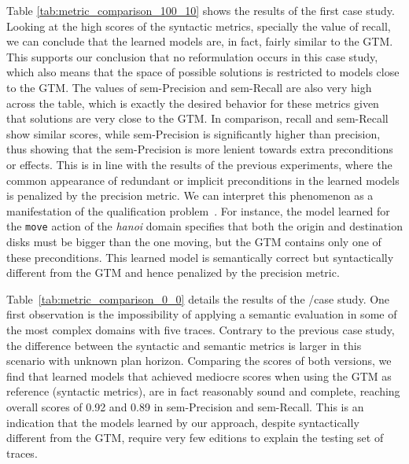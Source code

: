Table \ref{tab:metric_comparison_100_10} shows the results of the first case study. Looking at the high scores of the syntactic metrics, specially the value of recall, we can conclude that the learned models are, in fact, fairly similar to the GTM. This supports our conclusion that no reformulation occurs in this case study, which also means that the space of possible solutions is restricted to models close to the GTM. The values of sem-Precision and sem-Recall are also very high across the table, which is exactly the desired behavior for these metrics given that solutions are very close to the GTM. In comparison, recall and sem-Recall show similar scores, while sem-Precision is significantly higher than precision, thus showing that the sem-Precision is more lenient towards extra preconditions or effects. This is in line with the results of the previous experiments, where the common appearance of redundant or implicit preconditions in the learned models is penalized by the precision metric. We can interpret this phenomenon as a manifestation of the qualification problem~\cite{GinsbergS88}. For instance, the model learned for the {\tt\small move} action of the {\em hanoi} domain specifies that both the origin and destination disks must be bigger than the one moving, but the GTM contains only one of these preconditions. This learned model is semantically correct but syntactically different from the GTM and hence penalized by the precision metric.

Table~\ref{tab:metric_comparison_0_0} details the results of the \NO/\NO case study. One first observation is the impossibility of applying a semantic evaluation in some of the most complex domains with five traces. Contrary to the previous case study, the difference between the syntactic and semantic metrics is larger in this scenario with unknown plan horizon. Comparing the scores of both versions, we find that learned models that achieved mediocre scores when using the GTM as reference (syntactic metrics), are in fact reasonably sound and complete, reaching overall scores of 0.92 and 0.89 in sem-Precision and sem-Recall. This is an indication that the models learned by our approach, despite syntactically different from the GTM, require very few editions to explain the testing set of traces.

